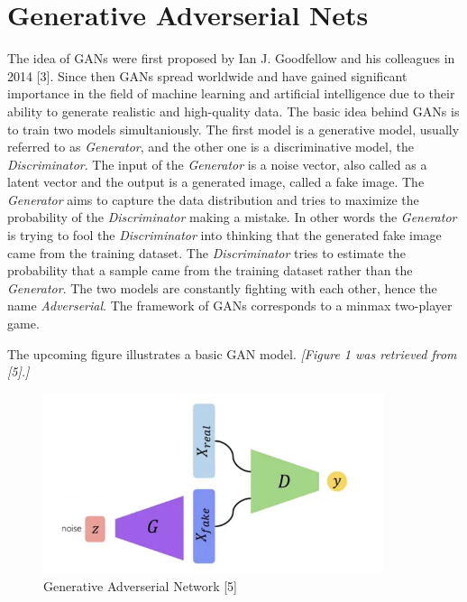\documentclass[lettersize,journal]{IEEEtran}
\begin{document}
\section{Generative Adverserial Nets}
The idea of GANs were first proposed by Ian J. Goodfellow and his colleagues in 2014 [3]. Since then GANs spread worldwide and have gained significant importance in the field of machine learning and artificial intelligence due to their ability to generate realistic and high-quality data. The basic idea behind GANs is to train two models simultaniously. The first model is a generative model, usually referred to as \textit{Generator}, and the other one is a discriminative model, the \textit{Discriminator}. The input of the \textit{Generator} is a noise vector, also called as a latent vector and the output is a generated image, called a fake image. The \textit{Generator} aims to capture the data distribution and tries to maximize the probability of the \textit{Discriminator} making a mistake. In other words the \textit{Generator} is trying to fool the \textit{Discriminator} into thinking that the generated fake image came from the training dataset. The \textit{Discriminator} tries to estimate the probability that a sample came from the training dataset rather than the \textit{Generator}. The two models are constantly fighting with each other, hence the name \textit{Adverserial}. The framework of GANs corresponds to a minmax two-player game.

\newpage

The upcoming figure illustrates a basic GAN model.\newline
\textit{[Figure 1 was retrieved from [5].]}

\begin{figure}[h]
    \centering
    \includegraphics[width=10cm]{GAN_layout}
    \caption{Generative Adverserial Network [5]}
    \label{fig_1}
\end{figure}
\end{document}
